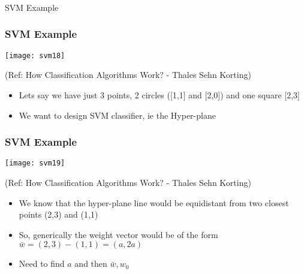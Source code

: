 \begin{frame}[fragile]\frametitle{}
\begin{center}
{\Large SVM Example}
\end{center}
\end{frame}

\begin{frame}[fragile] \frametitle{SVM Example}

\begin{center}
\texttt{[image: svm18]}

\tiny{(Ref: How Classification Algorithms Work? - Thales Sehn Korting)}
\end{center}
\begin{itemize}
\item Lets say we have just 3 points, 2 circles ([1,1] and [2,0]) and one square [2,3]
\item We want to design SVM classifier, ie the Hyper-plane
\end{itemize}
\end{frame}

\begin{frame}[fragile] \frametitle{SVM Example}

\begin{center}
\texttt{[image: svm19]}

\tiny{(Ref: How Classification Algorithms Work? - Thales Sehn Korting)}
\end{center}
\begin{itemize}
\item We know that the hyper-plane line would be equidistant from two closest points (2,3) and (1,1)
\item So, generically the weight vector would be of the form $ \bar{w} = (2,3) - (1,1) = (a,2a)$
\item Need to find $a$ and then $\bar{w}, w_0$
\end{itemize}
\end{frame}

